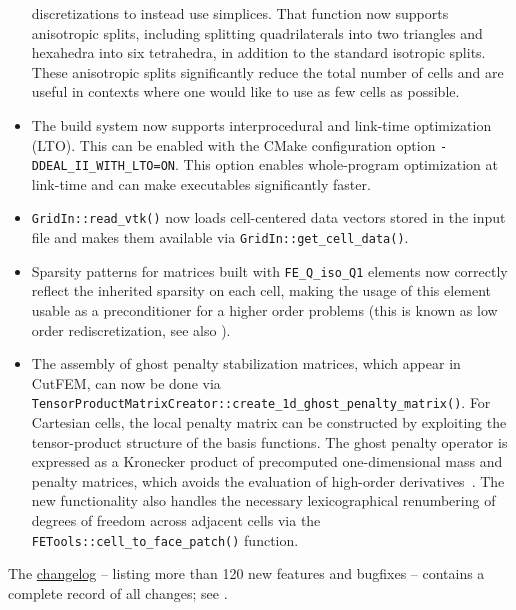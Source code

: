 \documentclass{ansarticle-preprint}
\begin{document}
\begin{itemize}
  discretizations to instead use simplices. That function now supports
  anisotropic splits, including splitting quadrilaterals into two triangles and
  hexahedra into six tetrahedra, in addition to the standard isotropic splits.
  These anisotropic splits significantly reduce the total number of cells and
  are useful in contexts where one would like to use as few cells as
  possible.
\item The build system now supports interprocedural and link-time optimization
  (LTO). This can be enabled with the CMake configuration option
  \texttt{-DDEAL\_II\_WITH\_LTO=ON}. This option enables whole-program
  optimization at link-time and can make executables significantly faster.
\item \texttt{GridIn::read\_vtk()} now loads cell-centered data vectors stored
  in the input file and makes them available via
  \texttt{GridIn::get\_cell\_data()}.
\item Sparsity patterns for matrices built with \texttt{FE\_Q\_iso\_Q1} elements
  now correctly reflect the inherited sparsity on each cell, making the usage of
  this element usable as a preconditioner for a higher order problems (this is known
  as low order rediscretization, see also \cite{pazner2023low}).
  \item The assembly of ghost penalty stabilization matrices, which appear in CutFEM, can now be done 
    via \texttt{TensorProductMatrixCreator::create\_1d\_ghost\_penalty\_matrix()}. For Cartesian cells, the local penalty matrix can be constructed by exploiting the tensor-product structure   
    of the basis functions. The ghost penalty operator is expressed as 
    a Kronecker product of precomputed one-dimensional mass and penalty matrices,
    which avoids the evaluation of high-order derivatives~\cite{wichrowski2025matrix}.
    The new functionality also handles the necessary lexicographical renumbering 
    of degrees of freedom across adjacent cells via the
    \texttt{FETools::cell\_to\_face\_patch()} function.
\end{itemize}
%
The
\href{https://dealii.org/current/doxygen/deal.II/changes_between_9_6_0_and_9_7_0.html}{changelog}
-- listing more than 120
new features and bugfixes --
contains a complete record of all changes; see \cite{changes97}.



\end{document}
